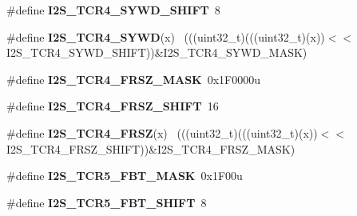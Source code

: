 \begin{DoxyCompactItemize}
\item 
\hypertarget{group___i2_s___register___masks_gadd23753698d7fb9a8948b1db0443fa4f}{}\#define {\bfseries I2\+S\+\_\+\+T\+C\+R4\+\_\+\+S\+Y\+W\+D\+\_\+\+S\+H\+I\+F\+T}~8\label{group___i2_s___register___masks_gadd23753698d7fb9a8948b1db0443fa4f}

\item 
\hypertarget{group___i2_s___register___masks_ga9b09e0c41108f2ccf828a70d32052721}{}\#define {\bfseries I2\+S\+\_\+\+T\+C\+R4\+\_\+\+S\+Y\+W\+D}(x)                                              ~(((uint32\+\_\+t)(((uint32\+\_\+t)(x))$<$$<$I2\+S\+\_\+\+T\+C\+R4\+\_\+\+S\+Y\+W\+D\+\_\+\+S\+H\+I\+F\+T))\&I2\+S\+\_\+\+T\+C\+R4\+\_\+\+S\+Y\+W\+D\+\_\+\+M\+A\+S\+K)\label{group___i2_s___register___masks_ga9b09e0c41108f2ccf828a70d32052721}

\item 
\hypertarget{group___i2_s___register___masks_ga1348cbea02cf3f38b5112c2ed27fafa0}{}\#define {\bfseries I2\+S\+\_\+\+T\+C\+R4\+\_\+\+F\+R\+S\+Z\+\_\+\+M\+A\+S\+K}~0x1\+F0000u\label{group___i2_s___register___masks_ga1348cbea02cf3f38b5112c2ed27fafa0}

\item 
\hypertarget{group___i2_s___register___masks_ga7db678baf12c9937bc1f2899876ed142}{}\#define {\bfseries I2\+S\+\_\+\+T\+C\+R4\+\_\+\+F\+R\+S\+Z\+\_\+\+S\+H\+I\+F\+T}~16\label{group___i2_s___register___masks_ga7db678baf12c9937bc1f2899876ed142}

\item 
\hypertarget{group___i2_s___register___masks_ga6d0a7293dab6f5586b7b2415e9e8eb43}{}\#define {\bfseries I2\+S\+\_\+\+T\+C\+R4\+\_\+\+F\+R\+S\+Z}(x)                                              ~(((uint32\+\_\+t)(((uint32\+\_\+t)(x))$<$$<$I2\+S\+\_\+\+T\+C\+R4\+\_\+\+F\+R\+S\+Z\+\_\+\+S\+H\+I\+F\+T))\&I2\+S\+\_\+\+T\+C\+R4\+\_\+\+F\+R\+S\+Z\+\_\+\+M\+A\+S\+K)\label{group___i2_s___register___masks_ga6d0a7293dab6f5586b7b2415e9e8eb43}

\item 
\hypertarget{group___i2_s___register___masks_ga95e32e5df1218cb76b09a99f46d9eca2}{}\#define {\bfseries I2\+S\+\_\+\+T\+C\+R5\+\_\+\+F\+B\+T\+\_\+\+M\+A\+S\+K}~0x1\+F00u\label{group___i2_s___register___masks_ga95e32e5df1218cb76b09a99f46d9eca2}

\item 
\hypertarget{group___i2_s___register___masks_gaaeadb079b059ec5d832aa9bce021f0ab}{}\#define {\bfseries I2\+S\+\_\+\+T\+C\+R5\+\_\+\+F\+B\+T\+\_\+\+S\+H\+I\+F\+T}~8\label{group___i2_s___register___masks_gaaeadb079b059ec5d832aa9bce021f0ab}


\end{DoxyCompactItemize}

